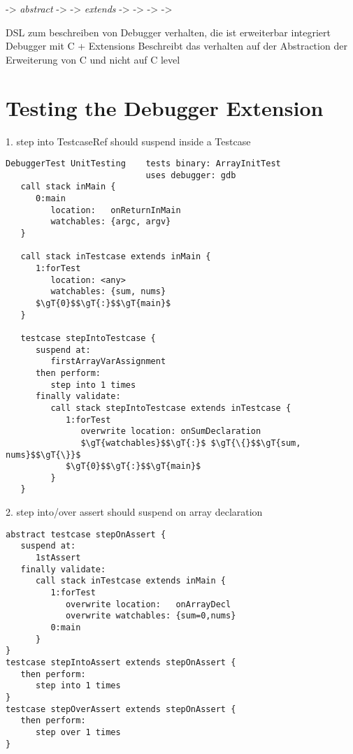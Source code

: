 	-> \emph{abstract} -> 
	-> \emph{extends} ->  
	-> 
	-> 
	-> 

 



DSL zum beschreiben von Debugger verhalten, 
die ist erweiterbar integriert Debugger mit C + Extensions
Beschreibt das verhalten auf der Abstraction 
der Erweiterung von C und nicht auf C level 
	
\section{Testing the Debugger Extension}

1. step into TestcaseRef should suspend inside a Testcase
\begin{lstlisting}[language=testingDSL]
DebuggerTest UnitTesting    tests binary: ArrayInitTest
                            uses debugger: gdb              
   call stack inMain {
      0:main
         location:   onReturnInMain
         watchables: {argc, argv}                     
   }
   
   call stack inTestcase extends inMain {
      1:forTest
         location: <any>
         watchables: {sum, nums}                  
      $\gT{0}$$\gT{:}$$\gT{main}$
   }
   
   testcase stepIntoTestcase {            
      suspend at: 
         firstArrayVarAssignment
      then perform:                         
         step into 1 times    
      finally validate:                         
         call stack stepIntoTestcase extends inTestcase {
            1:forTest
               overwrite location: onSumDeclaration
               $\gT{watchables}$$\gT{:}$ $\gT{\{}$$\gT{sum, nums}$$\gT{\}}$
            $\gT{0}$$\gT{:}$$\gT{main}$                       
         }
   }
\end{lstlisting}


2. step into/over assert should suspend on array declaration
\begin{lstlisting}[language=testingDSL]
abstract testcase stepOnAssert {
   suspend at: 
      1stAssert
   finally validate:
      call stack inTestcase extends inMain {
         1:forTest
            overwrite location:   onArrayDecl
            overwrite watchables: {sum=0,nums}
         0:main                      
      }
}
testcase stepIntoAssert extends stepOnAssert {            
   then perform:                         
      step into 1 times                            
}
testcase stepOverAssert extends stepOnAssert {            
   then perform:                         
      step over 1 times                            
}
\end{lstlisting}



